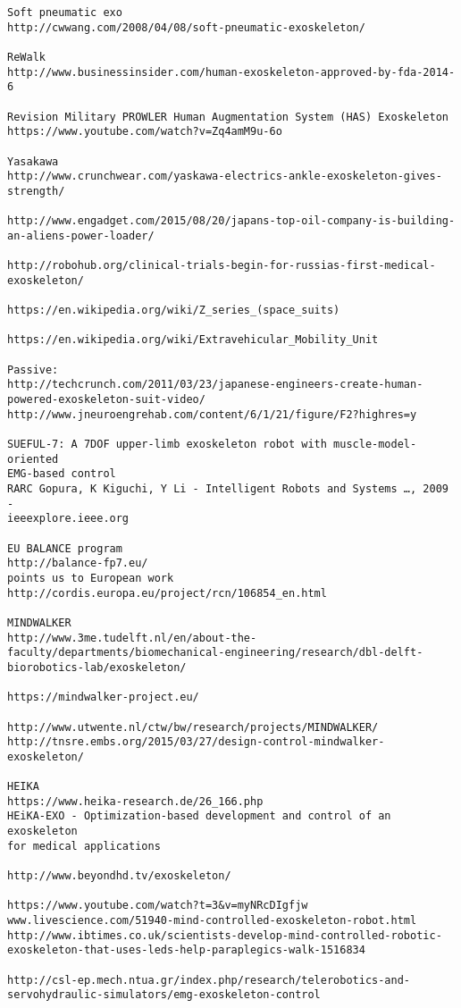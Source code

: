 \documentclass[letterpaper,12pt,fullpage]{article}
\begin{document}
\begin{verbatim}
Soft pneumatic exo
http://cwwang.com/2008/04/08/soft-pneumatic-exoskeleton/

ReWalk
http://www.businessinsider.com/human-exoskeleton-approved-by-fda-2014-6

Revision Military PROWLER Human Augmentation System (HAS) Exoskeleton
https://www.youtube.com/watch?v=Zq4amM9u-6o

Yasakawa
http://www.crunchwear.com/yaskawa-electrics-ankle-exoskeleton-gives-strength/

http://www.engadget.com/2015/08/20/japans-top-oil-company-is-building-an-aliens-power-loader/

http://robohub.org/clinical-trials-begin-for-russias-first-medical-exoskeleton/

https://en.wikipedia.org/wiki/Z_series_(space_suits)

https://en.wikipedia.org/wiki/Extravehicular_Mobility_Unit

Passive:
http://techcrunch.com/2011/03/23/japanese-engineers-create-human-powered-exoskeleton-suit-video/
http://www.jneuroengrehab.com/content/6/1/21/figure/F2?highres=y

SUEFUL-7: A 7DOF upper-limb exoskeleton robot with muscle-model-oriented
EMG-based control
RARC Gopura, K Kiguchi, Y Li - Intelligent Robots and Systems …, 2009 -
ieeexplore.ieee.org

EU BALANCE program
http://balance-fp7.eu/
points us to European work
http://cordis.europa.eu/project/rcn/106854_en.html

MINDWALKER
http://www.3me.tudelft.nl/en/about-the-faculty/departments/biomechanical-engineering/research/dbl-delft-biorobotics-lab/exoskeleton/

https://mindwalker-project.eu/

http://www.utwente.nl/ctw/bw/research/projects/MINDWALKER/
http://tnsre.embs.org/2015/03/27/design-control-mindwalker-exoskeleton/

HEIKA
https://www.heika-research.de/26_166.php
HEiKA-EXO - Optimization-based development and control of an exoskeleton
for medical applications

http://www.beyondhd.tv/exoskeleton/

https://www.youtube.com/watch?t=3&v=myNRcDIgfjw
www.livescience.com/51940-mind-controlled-exoskeleton-robot.html
http://www.ibtimes.co.uk/scientists-develop-mind-controlled-robotic-exoskeleton-that-uses-leds-help-paraplegics-walk-1516834

http://csl-ep.mech.ntua.gr/index.php/research/telerobotics-and-servohydraulic-simulators/emg-exoskeleton-control


\end{verbatim}
\end{document}
